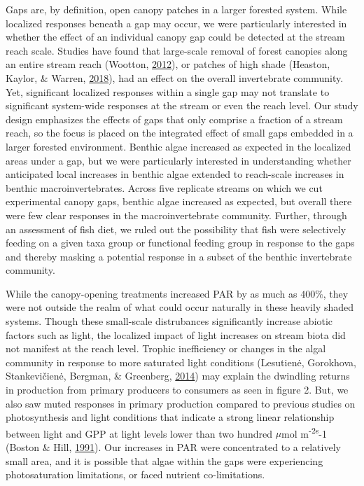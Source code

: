 \documentclass[double,12pt]{beavtex}
\begin{document}
  Gaps are, by definition, open canopy patches in a larger forested
  system. While localized responses beneath a gap may occur, we were
  particularly interested in whether the effect of an individual canopy
  gap could be detected at the stream reach scale. Studies have found that
  large-scale removal of forest canopies along an entire stream reach
  (Wootton, \protect\hyperlink{ref-Wootton2012}{2012}), or patches of high
  shade (Heaston, Kaylor, \& Warren,
  \protect\hyperlink{ref-Heaston2018}{2018}), had an effect on the overall
  invertebrate community. Yet, significant localized responses within a
  single gap may not translate to significant system-wide responses at the
  stream or even the reach level. Our study design emphasizes the effects
  of gaps that only comprise a fraction of a stream reach, so the focus is
  placed on the integrated effect of small gaps embedded in a larger
  forested environment. Benthic algae increased as expected in the
  localized areas under a gap, but we were particularly interested in
  understanding whether anticipated local increases in benthic algae
  extended to reach-scale increases in benthic macroinvertebrates. Across
  five replicate streams on which we cut experimental canopy gaps, benthic
  algae increased as expected, but overall there were few clear responses
  in the macroinvertebrate community. Further, through an assessment of
  fish diet, we ruled out the possibility that fish were selectively
  feeding on a given taxa group or functional feeding group in response to
  the gaps and thereby masking a potential response in a subset of the
  benthic invertebrate community.
  
  While the canopy-opening treatments increased PAR by as much as
  \(400\%\), they were not outside the realm of what could occur naturally
  in these heavily shaded systems. Though these small-scale distrubances
  significantly increase abiotic factors such as light, the localized
  impact of light increases on stream biota did not manifest at the reach
  level. Trophic inefficiency or changes in the algal community in
  response to more saturated light conditions (Lesutienė, Gorokhova,
  Stankevičienė, Bergman, \& Greenberg,
  \protect\hyperlink{ref-Lesutiene2014}{2014}) may explain the dwindling
  returns in production from primary producers to consumers as seen in
  figure 2. But, we also saw muted responses in primary production
  compared to previous studies on photosynthesis and light conditions that
  indicate a strong linear relationship between light and GPP at light
  levels lower than two hundred \(\mu\)mol m\textsuperscript{-2s}-1
  (Boston \& Hill, \protect\hyperlink{ref-Boston1991}{1991}). Our
  increases in PAR were concentrated to a relatively small area, and it is
  possible that algae within the gaps were experiencing photosaturation
  limitations, or faced nutrient co-limitations.
  
\end{document}
